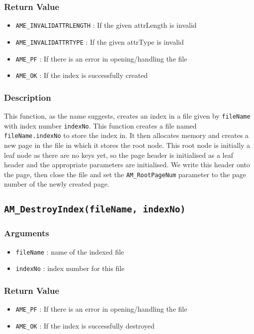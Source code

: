 \documentclass[a4paper, 12pt]{article}
\begin{document}
\subsubsection{Return Value}
\begin{itemize}
	\item{\texttt{AME\_INVALIDATTRLENGTH} : If the given attrLength is invalid}
	\item{\texttt{AME\_INVALIDATTRTYPE} : If the given attrType is invalid}
	\item{\texttt{AME\_PF} : If there is an error in opening/handling the file}
	\item{\texttt{AME\_OK} : If the index is successfully created}
\end{itemize}
\subsubsection{Description}
This function, as the name suggests, creates an index in a file given by \texttt{fileName} with index number \texttt{indexNo}. This function creates a file named \texttt{fileName.indexNo} to store the index in. It then allocates memory and creates a new page in the file in which it stores the root node. This root node is initially a leaf node as there are no keys yet, so the page header is initialised as a leaf header and the appropriate parameters are initialised. We write this header onto the page, then close the file and set the \texttt{AM\_RootPageNum} parameter to the page number of the newly created page.

\subsection{\texttt{AM\_DestroyIndex(fileName, indexNo)}}
\subsubsection{Arguments}
\begin{itemize}
	\item{\texttt{fileName} : name of the indexed file}
	\item{\texttt{indexNo} : index number for this file}
\end{itemize}
\subsubsection{Return Value}
\begin{itemize}
	\item{\texttt{AME\_PF} : If there is an error in opening/handling the file}
	\item{\texttt{AME\_OK} : If the index is successfully destroyed}
\end{itemize}
\end{document}
